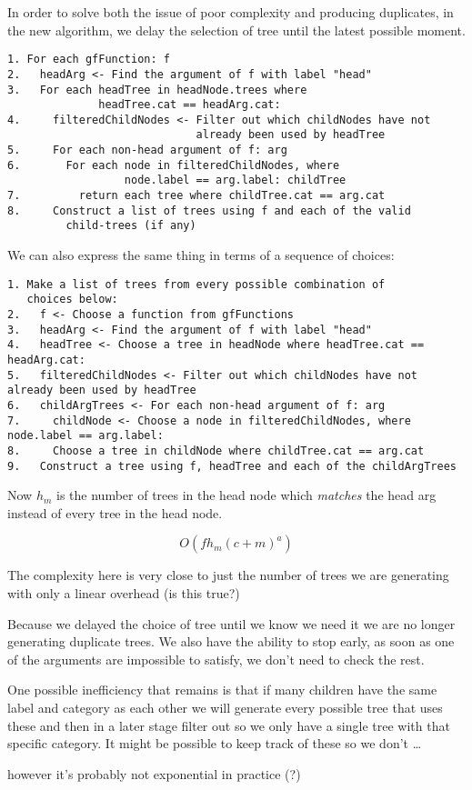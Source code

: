 In order to solve both the issue of poor complexity and producing duplicates, in the new algorithm, we delay the selection of tree until the latest possible moment.




\begin{verbatim}
1. For each gfFunction: f
2.   headArg <- Find the argument of f with label "head"
3.   For each headTree in headNode.trees where
              headTree.cat == headArg.cat:
4.     filteredChildNodes <- Filter out which childNodes have not
                             already been used by headTree
5.     For each non-head argument of f: arg
6.       For each node in filteredChildNodes, where
                  node.label == arg.label: childTree
7.         return each tree where childTree.cat == arg.cat
8.     Construct a list of trees using f and each of the valid
         child-trees (if any)
\end{verbatim}

We can also express the same thing in terms of a sequence of choices:

\begin{verbatim}
1. Make a list of trees from every possible combination of
   choices below:
2.   f <- Choose a function from gfFunctions
3.   headArg <- Find the argument of f with label "head"
4.   headTree <- Choose a tree in headNode where headTree.cat == headArg.cat:
5.   filteredChildNodes <- Filter out which childNodes have not already been used by headTree
6.   childArgTrees <- For each non-head argument of f: arg
7.     childNode <- Choose a node in filteredChildNodes, where node.label == arg.label:
8.     Choose a tree in childNode where childTree.cat == arg.cat
9.   Construct a tree using f, headTree and each of the childArgTrees
\end{verbatim}

Now $h_m$ is the number of trees in the head node which \emph{matches} the head arg instead of every tree in the head node.

$$
O(f h_m (c+m)^a)
$$

The complexity here is very close to just the number of trees we are generating with only a linear overhead (is this true?)

Because we delayed the choice of tree until we know we need it we are no longer generating duplicate trees.
We also have the ability to stop early, as soon as one of the arguments are impossible to satisfy, we don't need to check the rest.

One possible inefficiency that remains is that if many children have the same label and category as each other we will
generate every possible tree that uses these and then in a later stage filter out so we only have a single tree with that specific category. It might be possible to keep track of these so we don't \dots

however it's probably not exponential in practice (?)


